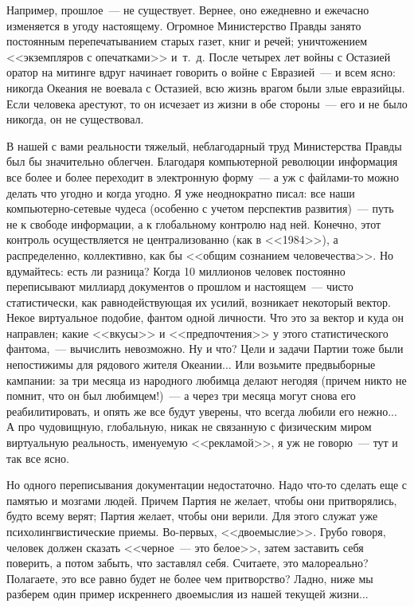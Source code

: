 \documentclass{scrbook}
\newcommand{\flqq}{<<}
\newcommand{\frqq}{>>}
\newcommand{\mdash}{~--- }
\newcommand{\commamdash}{~--- } %
\begin{document}
Например, прошлое{\mdash}не существует. Вернее, оно ежедневно и ежечасно изменяется в угоду настоящему. Огромное Министерство Правды занято постоянным перепечатыванием старых газет, книг и речей; уничтожением {\flqq}экземпляров с опечатками{\frqq} и~т.~д. После четырех лет войны с Остазией оратор на митинге вдруг начинает говорить о войне с Евразией{\mdash}и всем ясно: никогда Океания не воевала с Остазией, всю жизнь врагом были злые евразийцы. Если человека арестуют, то он исчезает из жизни в обе стороны{\mdash}его и не было никогда, он не существовал.

В нашей с вами реальности тяжелый, неблагодарный труд Министерства Правды был бы значительно облегчен. Благодаря компьютерной революции информация все более и более переходит в электронную форму{\mdash}а уж с файлами-то можно делать что угодно и когда угодно. Я уже неоднократно писал: все наши компьютерно-сетевые чудеса (особенно с учетом перспектив развития){\mdash}путь не к свободе информации, а к глобальному контролю над ней. Конечно, этот контроль осуществляется не централизованно (как в {\flqq}1984{\frqq}), а распределенно, коллективно, как бы {\flqq}общим сознанием человечества{\frqq}. Но вдумайтесь: есть ли разница? Когда 10 миллионов человек постоянно переписывают миллиард документов о прошлом и настоящем{\mdash}чисто статистически, как равнодействующая их усилий, возникает некоторый вектор. Некое виртуальное подобие, фантом одной личности. Что это за вектор и куда он направлен; какие {\flqq}вкусы{\frqq} и {\flqq}предпочтения{\frqq} у этого статистического фантома,{\commamdash}вычислить невозможно. Ну и что? Цели и задачи Партии тоже были непостижимы для рядового жителя Океании... Или возьмите предвыборные кампании: за три месяца из народного любимца делают негодяя (причем никто не помнит, что он был любимцем!){\mdash}а через три месяца могут снова его реабилитировать, и опять же все будут уверены, что всегда любили его нежно... А про чудовищную, глобальную, никак не связанную с физическим миром виртуальную реальность, именуемую {\flqq}рекламой{\frqq}, я уж не говорю{\mdash}тут и так все ясно.

Но одного переписывания документации недостаточно. Надо что-то сделать еще с памятью и мозгами людей. Причем Партия не желает, чтобы они притворялись, будто всему верят; Партия желает, чтобы они верили. Для этого служат уже психолингвистические приемы. Во-первых, {\flqq}двоемыслие{\frqq}. Грубо говоря, человек должен сказать {\flqq}черное{\mdash}это белое{\frqq}, затем заставить себя поверить, а потом забыть, что заставлял себя. Считаете, это малореально? Полагаете, это все равно будет не более чем притворство? Ладно, ниже мы разберем один пример искреннего двоемыслия из нашей текущей жизни...
\end{document}

